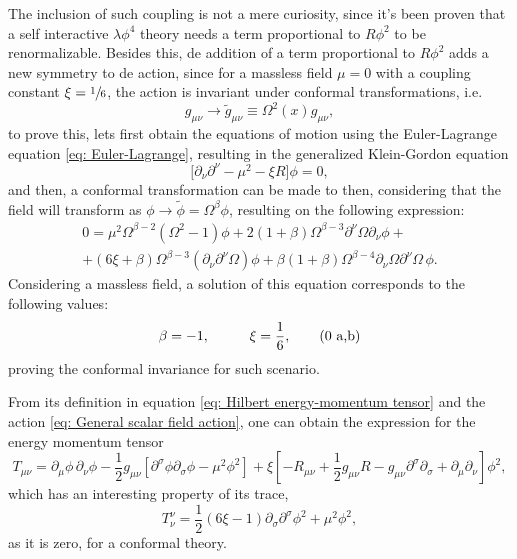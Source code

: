 The inclusion of such coupling is not a mere curiosity, since it's been proven \cite{Bunch_Renorm} that a self interactive $\lambda\phi^4$ theory needs a term proportional to $R\phi^2$ to be renormalizable. Besides this, de addition of a term proportional to $R\phi^2$ adds a new symmetry to de action, since for a massless field $\mu=0$ with a coupling constant $\xi=\sfrac{1}{6}$, the action is invariant under conformal transformations, i.e.
\begin{equation}\label{eq: Conformal Transformation}
	g_{\mu\nu}\rightarrow \tilde{g}_{\mu\nu}\equiv \Omega^2(x)g_{\mu\nu},
\end{equation}
to prove this, lets first obtain the equations of motion using the Euler-Lagrange equation \ref{eq: Euler-Lagrange}, resulting in the generalized Klein-Gordon equation
\begin{equation}
	\big[\partial_\nu\partial^\nu-\mu^2-\xi R\big]\phi=0,
\end{equation}
and then, a conformal transformation can be made to then, considering that the field will transform as $\phi\rightarrow\tilde{\phi}=\Omega^\beta\phi$, resulting on the following expression:
\begin{multline}
	0=\mu^2\Omega^{\beta-2}\left(\Omega^2-1\right)\phi+2\left(1+\beta\right)\Omega^{\beta-3}\partial^\nu\Omega\partial_\nu\phi+\\
	+(6\xi+\beta)\Omega^{\beta-3}\left(\partial_\nu\partial^\nu\Omega\right)\phi+\beta(1+\beta)\Omega^{\beta-4}\partial_\nu\Omega\partial^\nu\Omega\,\phi.
\end{multline}
Considering a massless field, a solution of this equation corresponds to the following values:
\begin{subequations}
	\begin{gather}
		\beta=-1,\hspace{1.0cm} \xi=\frac{1}{6},\tag{\theequation \,\,a,b}
	\end{gather}
\end{subequations}
proving the conformal invariance for such scenario.

From its definition in equation \ref{eq: Hilbert energy-momentum tensor} and the action \ref{eq: General scalar field action}, one can obtain the expression for the energy momentum tensor
\begin{equation}\label{eq: Energy-Momentum scalar}
	T_{\mu\nu}=\partial_\mu\phi\,\partial_\nu\phi -\frac{1}{2}g_{\mu\nu}\left[\partial^\sigma\phi\partial_\sigma\phi-\mu^2\phi^2\right]+\xi\left[-R_{\mu\nu}+\frac{1}{2}g_{\mu\nu}R-g_{\mu\nu}\partial^\sigma\partial_\sigma+\partial_\mu\partial_\nu\right]\phi^2,
\end{equation}
which has an interesting property of its trace,
\begin{equation}
	T^\nu_\nu=\frac{1}{2}\left(6\xi-1\right)\partial_\sigma\partial^\sigma\phi^2+\mu^2\phi^2,
\end{equation}
as it is zero, for a conformal theory.
